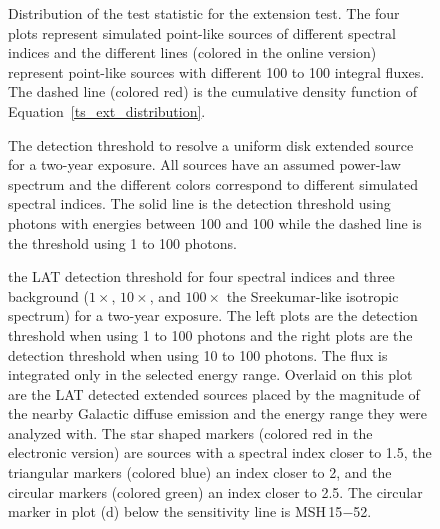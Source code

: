 \documentclass[12pt,preprint]{aastex}
\newif\ifcolorfigure
\newcommand{\mev}{\text{MeV}\xspace}
\newcommand{\gev}{\text{GeV}\xspace}
\begin{document}
\clearpage
\begin{figure}
    \ifcolorfigure
    \plotone{mc_plots/ts_ext_emin_1000_color.eps}
    \else
    \fi
    \caption{
    Distribution of the test statistic for the extension test.
    The four plots
    represent simulated point-like sources of different spectral indices and
    the different lines (colored in the online version) 
    represent point-like sources with different 100 \mev
    to 100 \gev integral fluxes.  The dashed line (colored red)
    is the cumulative
    density function of Equation~\ref{ts_ext_distribution}.
    }\label{ts_ext_mc}
  \end{figure}

\clearpage

\begin{figure}
    \ifcolorfigure
    \plotone{mc_plots/index_sensitivity_color.eps}
    \else
    \fi
    \caption{
    The detection threshold to resolve a
    uniform disk extended source for a two-year exposure.  All sources
    have an assumed power-law spectrum and the different colors correspond
    to different simulated spectral indices.  The solid line is the
    detection threshold using photons with energies between 100 \mev and 100
    \gev while the dashed line is the threshold using 1 \gev to 100 \gev photons.
    }\label{index_sensitivity}
  \end{figure}

\clearpage
\begin{figure}
    \ifcolorfigure
    \plotone{mc_plots/all_sensitivity_color.eps}
    \else
    \fi
    \caption{the LAT detection threshold for four spectral indices
    and three background ($1\times$, $10\times$, and $100\times$ the
    Sreekumar-like isotropic spectrum) for a two-year exposure. The
    left plots are the detection threshold when using 1 \gev to 100 \gev
    photons and the right plots are the detection threshold when using
    10 \gev to 100 \gev photons.  The flux is integrated only in the
    selected energy range.  Overlaid on this plot are the LAT detected
    extended sources placed by the magnitude of the nearby Galactic
    diffuse emission and the energy range they were analyzed with.
    The star shaped markers (colored red in the electronic version)
    are sources with a spectral index closer to 1.5, the triangular
    markers (colored blue) an index closer to 2, and the circular markers
    (colored green) an index closer to 2.5.  The circular marker in plot
    (d) below the sensitivity line is MSH\,15$-$52.
    }\label{all_sensitivity} 
  \end{figure}
\end{document}
